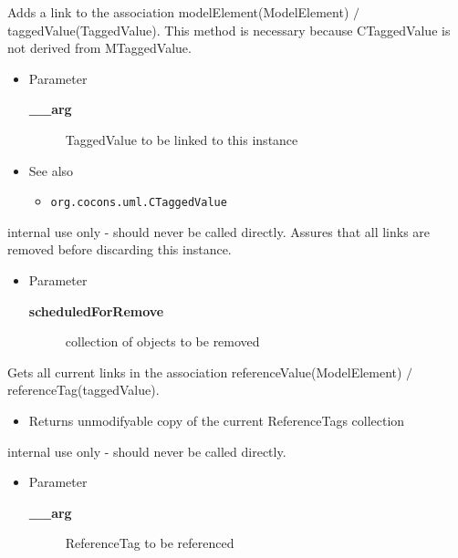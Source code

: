 \begin{desc}Adds a link to the association modelElement(ModelElement)
 $/$ taggedValue(TaggedValue).
 This method is necessary because CTaggedValue is not derived
 from MTaggedValue.
\begin{itemize}
\item{Parameter
  \begin{description}
   \item[{\bf \_\_arg}]{TaggedValue to be linked to this instance}
  \end{description}}
\end{itemize}
\begin{itemize}
\item{{See also}
  \begin{itemize}
   \item{{\tt org.cocons.uml.CTaggedValue} {
}
}
  \end{itemize}
}
\end{itemize}
\end{desc}

\begin{desc}internal use only - should never be called directly.
 Assures that all links are removed before
 discarding this instance.
\begin{itemize}
\item{Parameter
  \begin{description}
   \item[{\bf scheduledForRemove}]{collection of objects to be removed}
  \end{description}}
\end{itemize}
\end{desc}

\begin{desc}Gets all current links in the association referenceValue(ModelElement)
  $/$ referenceTag(taggedValue).
\begin{itemize}
\item{Returns unmodifyable copy of the current ReferenceTags collection }
\end{itemize}
\end{desc}

\begin{desc}internal use only - should never be called directly.
\begin{itemize}
\item{Parameter
  \begin{description}
   \item[{\bf \_\_arg}]{ReferenceTag to be referenced}
  \end{description}}
\end{itemize}
\end{desc}


